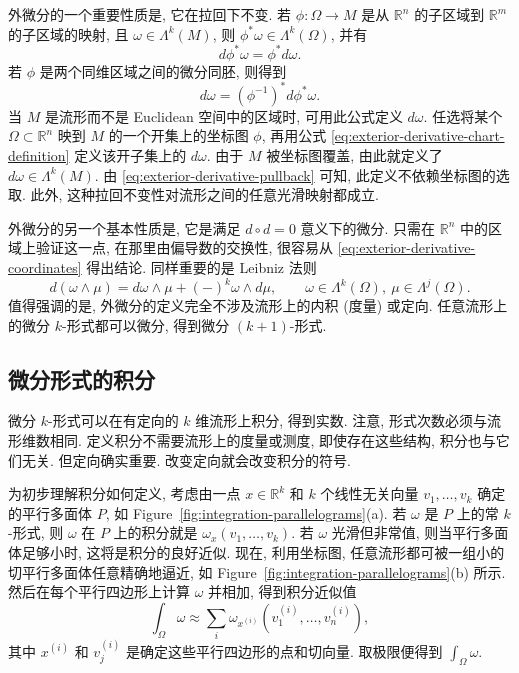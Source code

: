 外微分的一个重要性质是, 它在拉回下不变. 若 $\phi:\Omega\to M$ 是从 $\mathbb R^n$ 的子区域到 $\mathbb R^m$ 的子区域的映射, 且 $\omega\in\Lambda^k(M)$, 则 $\phi^*\omega\in\Lambda^k(\Omega)$, 并有
\begin{equation}\label{eq:exterior-derivative-pullback}
d\phi^*\omega=\phi^*d\omega.
\end{equation}
若 $\phi$ 是两个同维区域之间的微分同胚, 则得到
\begin{equation}\label{eq:exterior-derivative-chart-definition}
d\omega=(\phi^{-1})^*d\phi^*\omega.
\end{equation}
当 $M$ 是流形而不是 Euclidean 空间中的区域时, 可用此公式定义 $d\omega$. 任选将某个 $\Omega\subset\mathbb R^n$ 映到 $M$ 的一个开集上的坐标图 $\phi$, 再用公式 \eqref{eq:exterior-derivative-chart-definition} 定义该开子集上的 $d\omega$. 由于 $M$ 被坐标图覆盖, 由此就定义了 $d\omega\in\Lambda^k(M)$. 由 \eqref{eq:exterior-derivative-pullback} 可知, 此定义不依赖坐标图的选取. 此外, 这种拉回不变性对流形之间的任意光滑映射都成立.

外微分的另一个基本性质是, 它是满足 $d\circ d=0$ 意义下的微分. 只需在 $\mathbb R^n$ 中的区域上验证这一点, 在那里由偏导数的交换性, 很容易从 \eqref{eq:exterior-derivative-coordinates} 得出结论. 同样重要的是 Leibniz 法则
\begin{equation}\label{eq:exterior-leibniz-rule}
d(\omega\wedge\mu)=d\omega\wedge\mu+(-)^k\omega\wedge d\mu,\qquad\omega\in\Lambda^k(\Omega),\ \mu\in\Lambda^j(\Omega).
\end{equation}
值得强调的是, 外微分的定义完全不涉及流形上的内积 (度量) 或定向. 任意流形上的微分 $k$-形式都可以微分, 得到微分 $(k+1)$-形式.

\subsection{微分形式的积分}\label{subsec:differential-form-integration}

微分 $k$-形式可以在有定向的 $k$ 维流形上积分, 得到实数. 注意, 形式次数必须与流形维数相同. 定义积分不需要流形上的度量或测度, 即使存在这些结构, 积分也与它们无关. 但定向确实重要. 改变定向就会改变积分的符号.

为初步理解积分如何定义, 考虑由一点 $x\in\mathbb R^k$ 和 $k$ 个线性无关向量 $v_1,\ldots,v_k$ 确定的平行多面体 $P$, 如 Figure~\ref{fig:integration-parallelograms}(a). 若 $\omega$ 是 $P$ 上的常 $k$-形式, 则 $\omega$ 在 $P$ 上的积分就是 $\omega_x(v_1,\ldots,v_k)$. 若 $\omega$ 光滑但非常值, 则当平行多面体足够小时, 这将是积分的良好近似. 现在, 利用坐标图, 任意流形都可被一组小的切平行多面体任意精确地逼近, 如 Figure~\ref{fig:integration-parallelograms}(b) 所示. 然后在每个平行四边形上计算 $\omega$ 并相加, 得到积分近似值
\[
\int_\Omega\omega\approx\sum_i\omega_{x^{(i)}}(v_1^{(i)},\ldots,v_n^{(i)}),
\]
其中 $x^{(i)}$ 和 $v_j^{(i)}$ 是确定这些平行四边形的点和切向量. 取极限便得到 $\int_\Omega\omega$.

